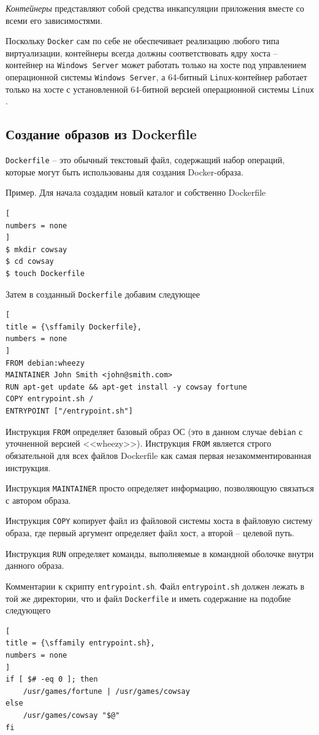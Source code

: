 \documentclass[%
	11pt,
	a4paper,
	utf8,
		]{article}
\begin{document}
\emph{Контейнеры} представляют собой средства инкапсуляции приложения вместе со всеми его зависимостями.

Поскольку \texttt{Docker} сам по себе не обеспечивает реализацию любого типа виртуализации, контейнеры всегда должны соответствовать ядру хоста -- контейнер на \texttt{Windows Server} может работать только на хосте под управлением операционной системы \texttt{Windows Server}, а 64-битный \texttt{Linux}-контейнер работает только на хосте с установленной 64-битной версией операционной системы \texttt{Linux} \cite{mouat:docker-2017}.

\subsection{Создание образов из Dockerfile}

\texttt{Dockerfile} -- это обычный текстовый файл, содержащий набор операций, которые могут быть использованы для создания Docker-образа.

Пример. Для начала создадим новый каталог и собственно Dockerfile

\begin{lstlisting}[
numbers = none
]
$ mkdir cowsay
$ cd cowsay
$ touch Dockerfile
\end{lstlisting}

Затем в созданный \texttt{Dockerfile} добавим следующее 
\begin{lstlisting}[
title = {\sffamily Dockerfile},
numbers = none
]
FROM debian:wheezy
MAINTAINER John Smith <john@smith.com>
RUN apt-get update && apt-get install -y cowsay fortune
COPY entrypoint.sh /
ENTRYPOINT ["/entrypoint.sh"]
\end{lstlisting}

Инструкция \texttt{FROM} определяет базовый образ ОС (это в данном случае \texttt{debian} с уточненной версией <<wheezy>>). Инструкция \texttt{FROM} является строго обязательной для всех файлов Dockerfile как самая первая незакомментированная инструкция.

Инструкция \texttt{MAINTAINER} просто определяет информацию, позволяющую связаться с автором образа.

Инструкция \texttt{COPY} копирует файл из файловой системы хоста в файловую систему образа, где первый аргумент определяет файл хост, а второй -- целевой путь.

Инструкция \texttt{RUN} определяет команды, выполняемые в командной оболочке внутри данного образа.

Комментарии к скрипту \texttt{entrypoint.sh}. Файл \texttt{entrypoint.sh} должен лежать в той же директории, что и файл \texttt{Dockerfile} и иметь содержание на подобие следующего
\begin{lstlisting}[
title = {\sffamily entrypoint.sh},
numbers = none
]
if [ $# -eq 0 ]; then
    /usr/games/fortune | /usr/games/cowsay
else
    /usr/games/cowsay "$@"
fi
\end{lstlisting}
\end{document}
